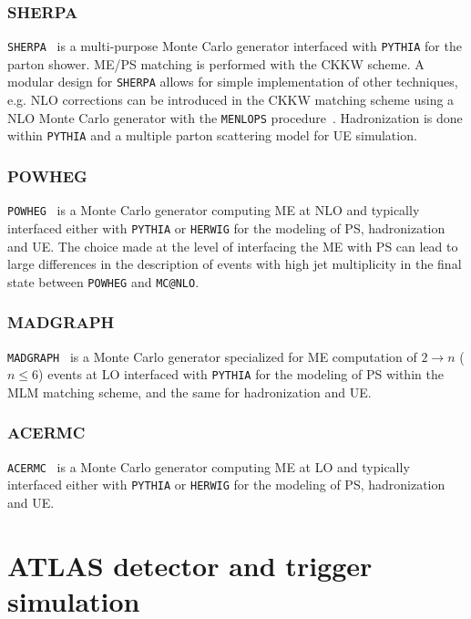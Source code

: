 \subsubsection*{SHERPA}

\texttt{SHERPA}~\cite{sherpa} is a multi-purpose Monte Carlo generator
interfaced with \texttt{PYTHIA} for the parton shower. ME/PS matching
is performed with the CKKW scheme.
A modular design for \texttt{SHERPA} allows for  simple implementation
of other techniques, e.g. NLO corrections can be introduced in the
CKKW matching scheme using a NLO Monte Carlo generator with the
\texttt{MENLOPS} procedure~\cite{MENLOPS}.
Hadronization is done within \texttt{PYTHIA} and a multiple parton 
scattering model for UE simulation.


\subsubsection*{POWHEG}

\texttt{POWHEG}~\cite{powheg} is a Monte Carlo generator computing
ME at NLO and typically interfaced either with \texttt{PYTHIA} or 
\texttt{HERWIG} for the modeling of PS, hadronization and UE.
The choice made at the level of interfacing the ME with PS
can lead to large differences in the description of events with
 high jet multiplicity in the final state between \texttt{POWHEG} 
and \texttt{MC@NLO}.

\subsubsection*{MADGRAPH}

\texttt{MADGRAPH}~\cite{madgraph} is a Monte Carlo generator 
specialized for ME computation of $2 \to n$ ($n\leq 6$) events at LO
interfaced with \texttt{PYTHIA} for the modeling of PS within the
MLM matching scheme, and the same for hadronization and UE.


\subsubsection*{ACERMC}

\texttt{ACERMC}~\cite{acermc} is a Monte Carlo generator computing
ME at LO and typically interfaced either with \texttt{PYTHIA} or 
\texttt{HERWIG} for the modeling of PS, hadronization and UE.



\section{ATLAS detector and trigger simulation}\label{sec:MCdetector}

